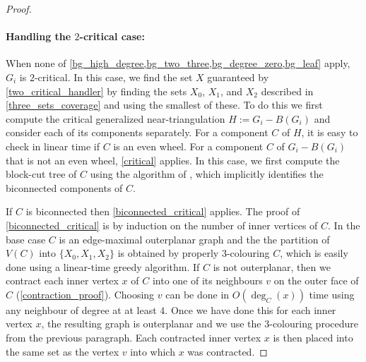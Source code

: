 \documentclass[11pt]{article}
\newcommand{\pat}[1]{\textcolor{red}{PM: #1}}
\newcommand{\hussein}[1]{\textcolor{purple}{HH: #1}}
\theoremstyle{definition}
\begin{document}
\begin{proof}




\paragraph{Handling the $2$-critical case:}
When none of \cref{bg_high_degree,bg_two_three,bg_degree_zero,bg_leaf} apply, $G_i$ is $2$-critical.  In this case, we find the set $X$ guaranteed by \cref{two_critical_handler} by finding the sets $X_0$, $X_1$, and $X_2$ described in \cref{three_sets_coverage} and using the smallest of these.  To do this we first compute the critical generalized near-triangulation $H:=G_i-B(G_i)$ and consider each of its components separately.  For a component $C$ of $H$, it is easy to check in linear time if $C$ is an even wheel.  For a component $C$ of $G_i-B(G_i)$ that is not an even wheel, \cref{critical} applies.  In this case, we first compute the block-cut tree of $C$ using the algorithm of \citet{hopcroft.tarjan:efficient}, which implicitly identifies the biconnected components of $C$.

If $C$ is biconnected then \cref{biconnected_critical} applies.  The proof of \cref{biconnected_critical} is by induction on the number of inner vertices of $C$.  In the base case $C$ is an edge-maximal outerplanar graph and the the partition of $V(C)$ into $\{X_0,X_1,X_2\}$ is obtained by properly $3$-colouring $C$, which is easily done using a linear-time greedy algorithm. If $C$ is not outerplanar, then we contract each inner vertex $x$ of $C$ into one of its neighbours $v$ on the outer face of $C$ (\cref{contraction_proof}).  Choosing $v$ can be done in $O(\deg_C(x))$ time using any neighbour of degree at at least $4$.  Once we have done this for each inner vertex $x$, the resulting graph is outerplanar and we use the $3$-colouring procedure from the previous paragraph.  Each contracted inner vertex $x$ is then placed into the  same set as the vertex $v$ into which $x$ was contracted.


\end{proof}
\end{document}
